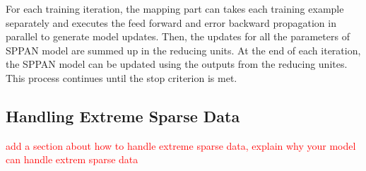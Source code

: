 For each training iteration, the mapping part can takes each training
example separately and executes the feed forward and error backward
propagation in parallel to generate model updates. Then, the updates
for all the parameters of SPPAN model are summed up in the reducing
units. At the end of each iteration, the SPPAN model can be updated
using the outputs from the reducing unites. This process continues
until the stop criterion is met.


\subsection{Handling Extreme Sparse Data}

\textcolor{red}{add a section about how to handle extreme sparse data,
  explain why your model can handle extrem sparse data}
